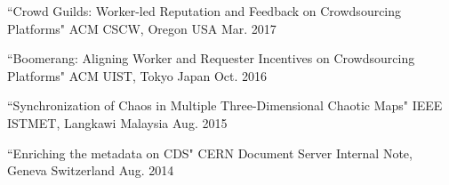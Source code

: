 

\begin{cventries}

  \cvpublications
    {``Crowd Guilds: Worker-led Reputation and Feedback on Crowdsourcing Platforms"} %
    {ACM CSCW, Oregon USA} %
    {Mar. 2017} %



  \cvpublications
    {``Boomerang: Aligning Worker and Requester Incentives on Crowdsourcing Platforms"} %
    {ACM UIST, Tokyo Japan} %
    {Oct. 2016} %


  \cvpublications
    {``Synchronization of Chaos in Multiple Three-Dimensional Chaotic Maps"} %
    {IEEE ISTMET, Langkawi Malaysia} %
    {Aug. 2015} %


  \cvpublications
    {``Enriching the metadata on CDS"} %
    {CERN Document Server Internal Note, Geneva Switzerland} %
    {Aug. 2014} %


\end{cventries}
